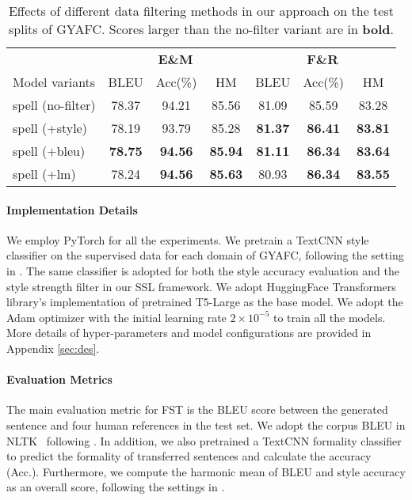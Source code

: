 \begin{table*}[t]
    \centering
    \small
\begin{tabular}{lcccccc}
        \toprule
        & \multicolumn{3}{c}{\textbf{E\&M}} & \multicolumn{3}{c}{\textbf{F\&R}} \\
 \cmidrule(lr){2-4} \cmidrule(lr){5-7} 
     Model variants    & BLEU & Acc(\%)& HM & BLEU & Acc(\%) & HM \\
    
      \midrule
      spell (no-filter)& 78.37 & 94.21 &85.56 & 81.09 &	85.59 &	83.28  \\
      spell (+style) & 78.19 &	93.79 &	85.28 &\textbf{81.37} &	\textbf{86.41} &	\textbf{83.81 }\\
      spell (+bleu) & \textbf{78.75} &	\textbf{94.56} &	\textbf{85.94} &\textbf{81.11 }&	\textbf{86.34} &	\textbf{83.64 }\\
      spell (+lm) & 78.24 &	\textbf{94.56 }&	\textbf{85.63} & 80.93 &	\textbf{86.34} &	\textbf{83.55}\\
        \bottomrule
    \end{tabular}
\caption{Effects of different data filtering methods in our approach on the test splits of GYAFC. Scores larger than the no-filter variant are in \textbf{bold}.}
    \label{tab:filter-res}
\end{table*}
\paragraph{Implementation Details} We employ PyTorch \citep{pytorch} for all the experiments.  We pretrain a TextCNN style classifier on the supervised data for each domain of GYAFC, following the setting in \cite{lai-etal-2021-thank}.
The same classifier is adopted for both the style accuracy evaluation and the style strength filter in our SSL framework. We adopt HuggingFace Transformers \citep{transformers} library's implementation of pretrained T5-Large \citep{2020t5} as the base model. We adopt the Adam \citep{adam} optimizer with the initial learning rate $2\times 10^{-5}$ to train all the models.  More details of hyper-parameters and model configurations are provided in Appendix \ref{sec:des}.





\paragraph{Evaluation Metrics}
The main evaluation metric for FST is the BLEU score between the generated sentence and four human references in the test set. We adopt the corpus BLEU in NLTK~\cite{loper-bird-2002-nltk} following \citep{chawla-yang-2020-semi}. In addition, we also pretrained a TextCNN formality classifier to predict the formality of transferred sentences and calculate the accuracy (Acc.). Furthermore, we compute the harmonic mean of BLEU and style accuracy as an overall score, following the settings in \cite{lai-etal-2021-thank}. 













